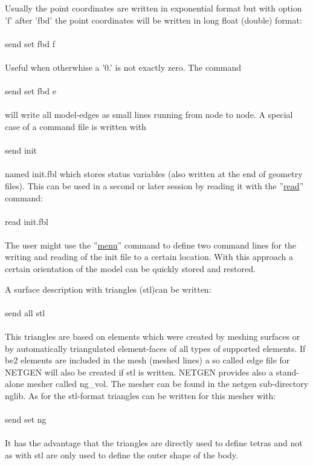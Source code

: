 \documentclass{article}
\providecommand{\htmlref}[2]{\hyperref[#2]{#1}}
\begin{document}
Usually the point coordinates are written in exponential format but with option 'f' after 'fbd' the point coordinates will be written in long float (double) format:\\\\send set fbd f\\\\Useful when otherwhise a '0.' is not exactly zero. The command \\\\send set fbd e\\\\will write all model-edges as small lines running from node to node. A special case of a command file is written with\\\\send init\\\\named init.fbl which stores status variables (also written at the end of geometry files). This can be used in a second or later session by reading it with the ''\htmlref{read}{read}'' command:\\\\read init.fbl\\\\The user might use the ''\htmlref{menu}{menu}'' command to define two command lines for the writing and reading of the init file to a certain location. With this approach a certain orientation of the model can be quickly stored and restored.

A surface description with triangles (stl)can be written:\\\\send all stl\\\\This triangles are based on elements which were created by meshing surfaces or by automatically triangulated element-faces of all types of supported elements. If be2 elements are included in the mesh (meshed lines) a so called edge file for NETGEN will also be created if stl is written. NETGEN provides also a stand-alone mesher called ng\_vol. The mesher can be found in the netgen sub-directory nglib. As for the stl-format triangles can be written for this mesher with:\\\\send set ng\\\\It has the advantage that the triangles are directly used to define tetras and not as with stl are only used to define the outer shape of the body.
\end{document}
